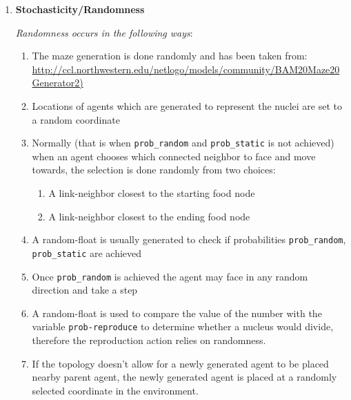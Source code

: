 \documentclass[a4paper, 12pt]{article}
\begin{document}
\begin{enumerate}
     \item \textbf{Stochasticity/Randomness} \par
    \textit{Randomness occurs in the following ways}:
    \begin{enumerate}
        \item The maze generation is done randomly and has been taken from:\\ \url{http://ccl.northwestern.edu/netlogo/models/community/BAM20Maze20Generator2)}
        \item Locations of agents which are generated to represent the nuclei are set to a random coordinate
        \item Normally (that is when \texttt{prob\_random} and \texttt{prob\_static} is not achieved) when an agent chooses which connected neighbor to face and move towards, the selection is done randomly from two choices:
        \begin{enumerate}
            \item A link-neighbor closest to the starting food node
            \item A link-neighbor closest to the ending food node
        \end{enumerate}
        \item A random-float is usually generated to check if probabilities \texttt{prob\_random}, \texttt{prob\_static} are achieved
        \item Once \texttt{prob\_random} is achieved the agent may face in any random direction and take a step
        \item A random-float is used to compare the value of the number with the variable \texttt{prob-reproduce} to determine whether a nucleus would divide, therefore the reproduction action relies on randomness.  
        \item If the topology doesn't allow for a newly generated agent to be placed nearby parent agent, the newly generated agent is placed at a randomly selected coordinate in the environment.
    \end{enumerate}
    

\end{enumerate}
\end{document}
